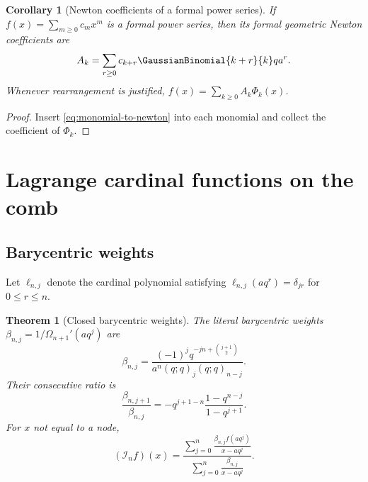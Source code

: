 \documentclass[11pt,a4paper,oneside]{article}
\newtheorem{theorem}{Theorem}[section]
\newtheorem{corollary}[corollary]{Corollary}
\theoremstyle{definition}
\theoremstyle{remark}
\newcommand{\Iop}{\mathcal I}
\begin{document}
\begin{corollary}[Newton coefficients of a formal power series]
\label{cor:formal-newton-coefficients}
If $f(x)=\sum_{m\ge0}c_mx^m$ is a formal power series, then its formal
geometric Newton coefficients are
\begin{equation}
 A_k=\sum_{r\ge0}c_{k+r}\GaussianBinomial{k+r}{k}q a^r.
 \label{eq:formal-Ak}
\end{equation}
Whenever rearrangement is justified,
$f(x)=\sum_{k\ge0}A_k\Phi_k(x)$.
\end{corollary}

\begin{proof}
Insert \eqref{eq:monomial-to-newton} into each monomial and collect the
coefficient of $\Phi_k$.
\end{proof}

\section{Lagrange cardinal functions on the comb}
\label{sec:lagrange}

\subsection{Barycentric weights}

Let $\ell_{n,j}$ denote the cardinal polynomial satisfying
$\ell_{n,j}(aq^r)=\delta_{jr}$ for $0\le r\le n$.

\begin{theorem}[Closed barycentric weights]
\label{thm:barycentric}
The literal barycentric weights
$\beta_{n,j}=1/\Omega_{n+1}'(aq^j)$ are
\begin{equation}
 \beta_{n,j}
 =\frac{(-1)^jq^{-jn+\binom{j+1}{2}}}
 {a^n(q;q)_j(q;q)_{n-j}}.
 \label{eq:barycentric-weights}
\end{equation}
Their consecutive ratio is
\begin{equation}
 \frac{\beta_{n,j+1}}{\beta_{n,j}}
 =-q^{j+1-n}\frac{1-q^{n-j}}{1-q^{j+1}}.
 \label{eq:barycentric-ratio}
\end{equation}
For $x$ not equal to a node,
\begin{equation}
 (\Iop_nf)(x)=
 \frac{\displaystyle\sum_{j=0}^n
       \frac{\beta_{n,j}f(aq^j)}{x-aq^j}}
      {\displaystyle\sum_{j=0}^n
       \frac{\beta_{n,j}}{x-aq^j}}.
 \label{eq:barycentric-formula}
\end{equation}
\end{theorem}
\end{document}
